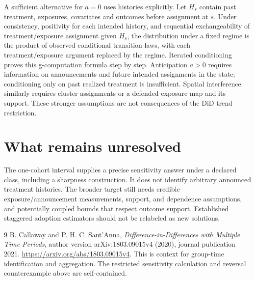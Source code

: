 \documentclass[11pt]{article}
\theoremstyle{definition}
\begin{document}
A sufficient alternative for $a=0$ uses histories explicitly. Let $H_s$ contain
past treatment, exposures, covariates and outcomes before assignment at $s$.
Under consistency, positivity for each intended history, and sequential
exchangeability of treatment/exposure assignment given $H_s$, the distribution
under a fixed regime is the product of observed conditional transition laws,
with each treatment/exposure argument replaced by the regime. Iterated
conditioning proves this g-computation formula step by step. Anticipation
$a>0$ requires information on announcements and future intended assignments in
the state; conditioning only on past realized treatment is insufficient.
Spatial interference similarly requires cluster assignments or a defended
exposure map and its support. These stronger assumptions are not consequences
of the DiD trend restriction.

\section*{What remains unresolved}
The one-cohort interval supplies a precise sensitivity answer under a declared
class, including a sharpness construction. It does not identify arbitrary
announced treatment histories. The broader target still needs credible
exposure/announcement measurements, support, and dependence assumptions, and
potentially coupled bounds that respect outcome support. Established staggered
adoption estimators should not be relabeled as new solutions.
\begin{thebibliography}{9}
 B. Callaway and P. H. C. Sant'Anna,
\emph{Difference-in-Differences with Multiple Time Periods}, author version
arXiv:1803.09015v4 (2020), journal publication 2021.
\url{https://arxiv.org/abs/1803.09015v4}.
This is context for group-time identification and aggregation. The restricted
sensitivity calculation and reversal counterexample above are self-contained.
\end{thebibliography}
\end{document}
